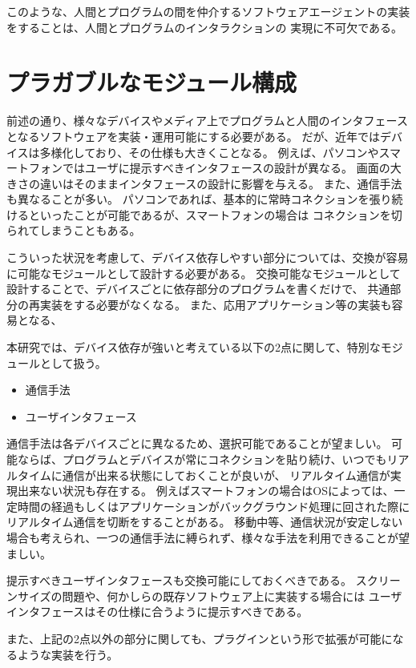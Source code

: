 このような、人間とプログラムの間を仲介するソフトウェアエージェントの実装をすることは、人間とプログラムのインタラクションの
実現に不可欠である。

\section{プラガブルなモジュール構成}\label{sec:plaggable-module-design}

前述の通り、様々なデバイスやメディア上でプログラムと人間のインタフェースとなるソフトウェアを実装・運用可能にする必要がある。
だが、近年ではデバイスは多様化しており、その仕様も大きくことなる。
例えば、パソコンやスマートフォンではユーザに提示すべきインタフェースの設計が異なる。
画面の大きさの違いはそのままインタフェースの設計に影響を与える。
また、通信手法も異なることが多い。
パソコンであれば、基本的に常時コネクションを張り続けるといったことが可能であるが、スマートフォンの場合は
コネクションを切られてしまうこともある。

こういった状況を考慮して、デバイス依存しやすい部分については、交換が容易に可能なモジュールとして設計する必要がある。
交換可能なモジュールとして設計することで、デバイスごとに依存部分のプログラムを書くだけで、
共通部分の再実装をする必要がなくなる。
また、応用アプリケーション等の実装も容易となる、

本研究では、デバイス依存が強いと考えている以下の2点に関して、特別なモジュールとして扱う。

\begin{itemize}
\itemsep1pt\parskip0pt
\item
  通信手法
\item
  ユーザインタフェース
\end{itemize}

通信手法は各デバイスごとに異なるため、選択可能であることが望ましい。
可能ならば、プログラムとデバイスが常にコネクションを貼り続け、いつでもリアルタイムに通信が出来る状態にしておくことが良いが、
リアルタイム通信が実現出来ない状況も存在する。
例えばスマートフォンの場合はOSによっては、一定時間の経過もしくはアプリケーションがバックグラウンド処理に回された際に
リアルタイム通信を切断をすることがある。
移動中等、通信状況が安定しない場合も考えられ、一つの通信手法に縛られず、様々な手法を利用できることが望ましい。

提示すべきユーザインタフェースも交換可能にしておくべきである。
スクリーンサイズの問題や、何かしらの既存ソフトウェア上に実装する場合には
ユーザインタフェースはその仕様に合うように提示すべきである。

また、上記の2点以外の部分に関しても、プラグインという形で拡張が可能になるような実装を行う。

